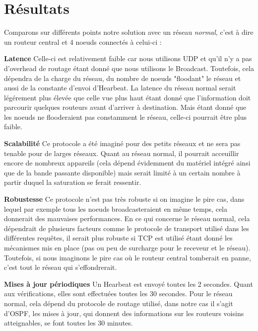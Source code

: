 \documentclass[journal, a4paper]{IEEEtran}
\begin{document}
\section{Résultats}
        Comparons sur différents points notre solution avec un réseau \textit{normal}, c'est à dire un routeur central et 4 noeuds connectés à celui-ci : 

        \textbf{Latence} Celle-ci est relativement faible car nous utilisons UDP et qu'il n'y a pas d'overhead de routage étant donné que nous utilisons
        le Broadcast. Toutefois, cela dépendra de la charge du réseau, du nombre de noeuds "floodant" le réseau et aussi de la constante d'envoi d'Hearbeat. 
        La latence du réseau normal serait légérement plus élevée que celle vue plus haut étant donné que l'information doit parcourir quelques routeurs avant d'arriver à destination. Mais 
        étant donné que les noeuds ne flooderaient pas constamment le réseau, celle-ci pourrait être plus faible. 

        \textbf{Scalabilité} Ce protocole a été imaginé pour des petits réseaux et ne sera pas tenable pour de larges réseaux. 
        Quant au réseau normal, il pourrait acceuillir encore de nombreux appareils (cela dépend évidemment du matériel intégré ainsi que de la bande passante disponible) mais serait 
        limité à un certain nombre à partir duquel la saturation se ferait ressentir.

        \textbf{Robustesse} Ce protocole n'est pas très robuste si on imagine le pire cas, dans lequel par exemple tous les noeuds broadcasteraient en même 
        temps, cela donnerait des mauvaises performances.
        En ce qui concerne le réseau normal, cela dépendrait de plusieurs facteurs comme le protocole de transport utilisé dans les différentes requêtes, il serait plus robuste si TCP est utilisé étant donné les mécanismes mis en place 
        (pas ou peu de surcharge pour le receveur et le réseau). Toutefois, si nous imaginons le pire cas où le routeur central tomberait en panne, c'est tout le réseau qui s'effondrerait.  

        \textbf{Mises à jour périodiques} Un Hearbeat est envoyé toutes les 2 secondes. Quant aux vérifications, elles sont effectuées toutes les 30 secondes. 
        Pour le réseau normal, cela dépend du protocole de routage utilisé, dans notre cas il s'agit d'OSPF, les mises à jour, qui donnent des informations sur les routeurs voisins 
        atteignables, se font toutes les 30 minutes. 
\end{document}
